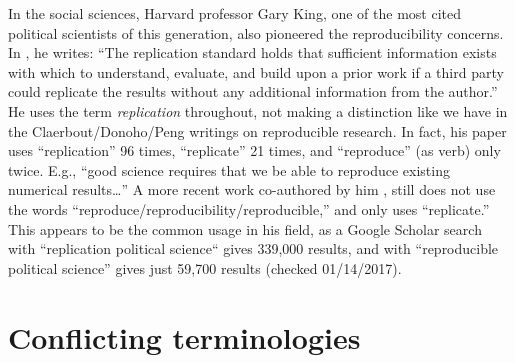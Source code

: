 \documentclass{statement}
\newlength{\up}
\begin{document}
In the social sciences, Harvard professor Gary King, one of the most cited political scientists of this generation, also pioneered the reproducibility concerns. 
In \cite{king1995}, he writes: ``The replication standard holds that sufficient information exists with which to understand, evaluate, and build upon a prior work if a third party could replicate the results without any additional information from the author.'' He uses the term \emph{replication} throughout, not making a distinction like we have in the Claerbout/Donoho/Peng writings on reproducible research. 
In fact, his paper uses ``replication'' 96 times, ``replicate'' 21 times, and ``reproduce'' (as verb) only twice. E.g., ``good science requires that we be able to reproduce existing numerical results\ldots''
A more recent work co-authored by him \cite[]{lazerETal2014}, still does not use the words ``reproduce/reproducibility/reproducible,'' and only uses ``replicate.'' 
This appears to be the common usage in his field, as a Google Scholar search with ``replication political science`` gives 339,000 results, and with ``reproducible political science'' gives just 59,700 results (checked 01/14/2017).


\section*{Conflicting terminologies}
\vspace{\up}
\end{document}
